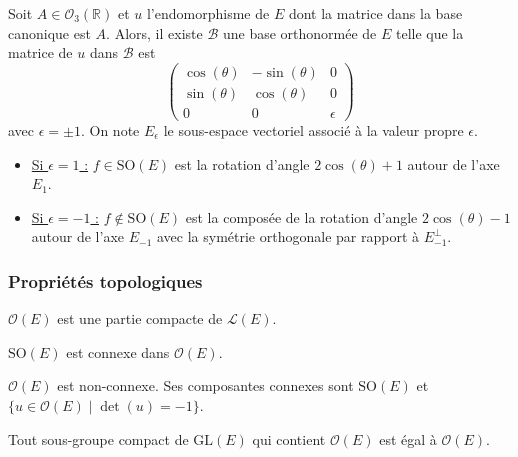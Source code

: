 	\begin{theorem}
		Soit $A \in \mathcal{O}_3(\mathbb{R})$ et $u$ l'endomorphisme de $E$ dont la matrice dans la base canonique est $A$. Alors, il existe $\mathcal{B}$ une base orthonormée de $E$ telle que la matrice de $u$ dans $\mathcal{B}$ est
		\[ \begin{pmatrix} \cos(\theta) & -\sin(\theta) & 0 \\ \sin(\theta) & \cos(\theta) & 0 \\ 0 & 0 & \epsilon \end{pmatrix} \]
		avec $\epsilon = \pm 1$. On note $E_\epsilon$ le sous-espace vectoriel associé à la valeur propre $\epsilon$.
		\begin{itemize}
			\item \underline{Si $\epsilon = 1$ :} $f \in \mathrm{SO}(E)$ est la rotation d'angle $2\cos(\theta) + 1$ autour de l'axe $E_1$.
			\item \underline{Si $\epsilon = -1$ :} $f \notin \mathrm{SO}(E)$ est la composée de la rotation d'angle $2\cos(\theta) - 1$ autour de l'axe $E_{-1}$ avec la symétrie orthogonale par rapport à $E_{-1}^{\perp}$.
		\end{itemize}
	\end{theorem}

	\subsubsection{Propriétés topologiques}


	\begin{proposition}
		$\mathcal{O}(E)$ est une partie compacte de $\mathcal{L}(E)$.
	\end{proposition}

	\begin{proposition}
		$\mathrm{SO}(E)$ est connexe dans $\mathcal{O}(E)$.
	\end{proposition}

	\begin{corollary}
		$\mathcal{O}(E)$ est non-connexe. Ses composantes connexes sont $\mathrm{SO}(E)$ et $\{ u \in \mathcal{O}(E) \mid \det(u) = -1 \}$.
	\end{corollary}


	\begin{proposition}
		Tout sous-groupe compact de $\mathrm{GL}(E)$ qui contient $\mathcal{O}(E)$ est égal à $\mathcal{O}(E)$.
	\end{proposition}

